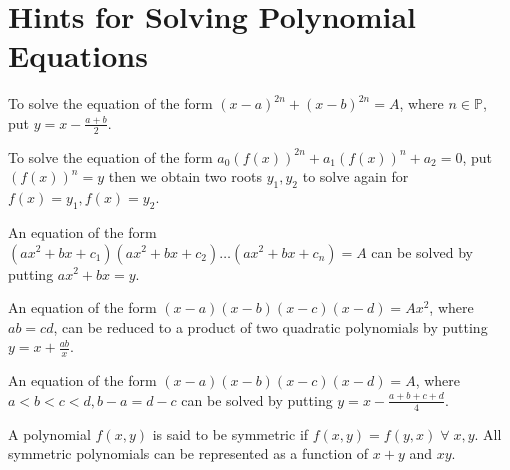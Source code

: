 \section{Hints for Solving Polynomial Equations}
\startitemize[n]
\item To solve the equation of the form $(x - a)^{2n} + (x - b)^{2n} = A$, where $n\in\mathbb{P}$, put $y = x - \frac{a + b}{2}$.
\item To solve the equation of the form $a_0(f(x))^{2n} + a_1(f(x))^{n} + a_2 = 0$, put $(f(x))^n = y$ then we obtain two roots
  $y_1, y_2$ to solve again for $f(x) = y_1, f(x) = y_2$.
\item An equation of the form $(ax^2 + bx + c_1)(ax^2 + bx + c_2)\ldots(ax^2 + bx + c_n) = A$ can be solved by putting $ax^2 + bx =
  y$.
\item An equation of the form $(x - a)(x - b)(x - c)(x - d) = Ax^2$, where $ab = cd$, can be reduced to a product of two quadratic
  polynomials by putting $y = x + \frac{ab}{x}$.
\item An equation of the form $(x - a)(x - b)(x - c)(x - d) = A$, where $a<b<c<d, b - a = d - c$ can be solved by putting $y = x -
  \frac{a + b + c + d}{4}$.
\item A polynomial $f(x, y)$ is said to be symmetric if $f(x, y) = f(y, x)\;\forall\;x, y$. All symmetric polynomials can be
  represented as a function of $x + y$ and $xy$.
\stopitemize


